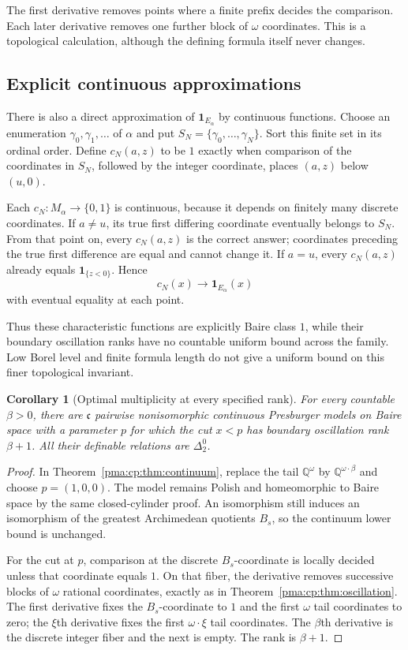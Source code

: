 \documentclass[11pt]{article}
\numberwithin{equation}{section}
\newtheorem{corollary}[corollary]{Corollary}
\theoremstyle{definition}
\theoremstyle{remark}
\newcommand{\Q}{\mathbb Q}
\newcommand{\one}{\mathbf 1}
\newcommand{\cp}{\mathfrak c}
\begin{document}
The first derivative removes points where a finite prefix decides the
comparison. Each later derivative removes one further block of $\omega$
coordinates. This is a topological calculation, although the defining
formula itself never changes.

\subsection{Explicit continuous approximations}

There is also a direct approximation of $\one_{E_\alpha}$ by continuous
functions. Choose an enumeration $\gamma_0,\gamma_1,\ldots$ of $\alpha$
and put $S_N=\{\gamma_0,\ldots,\gamma_N\}$. Sort this finite set in
its ordinal order. Define $c_N(a,z)$ to be $1$ exactly when comparison of
the coordinates in $S_N$, followed by the integer coordinate, places
$(a,z)$ below $(u,0)$.

Each $c_N:M_\alpha\to\{0,1\}$ is continuous, because it depends on
finitely many discrete coordinates. If $a\ne u$, its true first
differing coordinate eventually belongs to $S_N$. From that point on,
every $c_N(a,z)$ is the correct answer; coordinates preceding the true
first difference are equal and cannot change it. If $a=u$, every
$c_N(a,z)$ already equals $\one_{\{z<0\}}$. Hence
\[
c_N(x)\longrightarrow\one_{E_\alpha}(x)
\]
with eventual equality at each point.

Thus these characteristic functions are explicitly Baire class $1$,
while their boundary oscillation ranks have no countable uniform bound
across the family. Low Borel level and finite formula length do not give
a uniform bound on this finer topological invariant.

\begin{corollary}[Optimal multiplicity at every specified rank]
\label{pma:cp:cor:continuumranks}
For every countable $\beta>0$, there are $\cp$ pairwise nonisomorphic
continuous Presburger models on Baire space with a parameter $p$ for which
the cut $x<p$ has boundary oscillation rank $\beta+1$. All their definable
relations are $\Delta^0_2$.
\end{corollary}

\begin{proof}
In Theorem~\ref{pma:cp:thm:continuum}, replace the tail $\Q^\omega$ by
$\Q^{\omega\cdot\beta}$ and choose $p=(1,0,0)$. The model remains
Polish and homeomorphic to Baire space by the same closed-cylinder proof.
An isomorphism still induces an isomorphism of the greatest Archimedean
quotients $B_s$, so the continuum lower bound is unchanged.

For the cut at $p$, comparison at the discrete $B_s$-coordinate is locally
decided unless that coordinate equals $1$. On that fiber, the derivative
removes successive blocks of $\omega$ rational coordinates, exactly as
in Theorem~\ref{pma:cp:thm:oscillation}. The first derivative fixes the
$B_s$-coordinate to $1$ and the first $\omega$ tail coordinates to zero;
the $\xi$th derivative fixes the first $\omega\cdot\xi$ tail
coordinates. The $\beta$th derivative is the discrete integer fiber and
the next is empty. The rank is $\beta+1$.
\end{proof}
\end{document}
